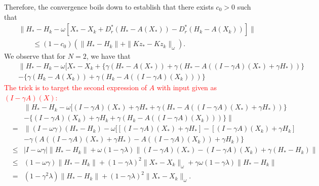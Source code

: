 Therefore, the convergence boils down to establish that there exists $c_0 > 0$ such that 
\begin{eqnarray*}
&& \|H_* - H_k - \omega [X_* - X_k + D_r^* (H_* - A(X_*)) - D_r^* (H_k - A(X_k))] \| \\
&&\qquad \leq (1 - c_0) \left ( \|H_{*} - H_{k}\| + \|Kz_* - Kz_{k}\|_{\omega} \right ). 
\end{eqnarray*}
We observe that for $N = 2$, we have that 
\begin{eqnarray*}
&&  \|H_* - H_k - \omega [X_* - X_k + \{ \gamma ( H_* - A(X_*) ) + \gamma (H_* - A((I - \gamma A)(X_*) + \gamma H_*)) \} \\
&& 
- \{ \gamma ( H_k - A(X_k)) + \gamma (H_k - A((I - \gamma A)(X_k))) \}
\end{eqnarray*}
\textcolor{red}{The trick is to target the second expression of $A$ with input given as $(I - \gamma A)(X)$:} 
\begin{eqnarray*}
&&  \|H_* - H_k - \omega [(I - \gamma A)(X_*) + \gamma H_* +  \gamma (H_* - A((I - \gamma A)(X_*) + \gamma H_*)) \} \\
&& 
- \{(I - \gamma A)(X_k) + \gamma H_k + \gamma (H_k - A((I - \gamma A)(X_k))) \} \| \\ 
&=& \|(I - \omega \gamma) (H_* - H_k) - \omega [[(I - \gamma A)(X_*) + \gamma H_*] - [(I - \gamma A)(X_k) + \gamma H_k] \\
&& - \gamma ( A((I - \gamma A)(X_*) + \gamma H_*) - A((I - \gamma A)(X_k)) + \gamma H_k) \} \\ 
&\leq& |I - \omega \gamma |\|H_* - H_k\| + \omega (1 - \gamma \lambda) \|(I - \gamma A)(X_*) - (I - \gamma A)(X_k) + \gamma (H_* - H_k)\| \\ 
&\leq& (1 - \omega \gamma) \|H_* - H_k\| + (1 - \gamma \lambda)^2 \|X_* - X_k\|_\omega + \gamma \omega (1 - \gamma \lambda) \|H_* - H_k\| \\ 
&=& (1 - \gamma^2 \lambda) \|H_* - H_k\| + (1 - \gamma \lambda)^2 \|X_* - X_k\|_\omega. 
\end{eqnarray*}




